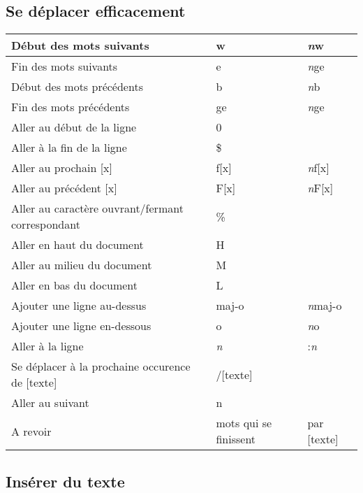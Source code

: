 \documentclass{article}
\begin{document}
\subsection{Se déplacer efficacement}
\begin{center}
\newline\begin{tabular}{|l|l|l|}
    \hline
    Début des mots suivants & w & \textit{n}w \\
    \hline
    Fin des mots suivants & e & \textit{n}ge \\
    \hline
    Début des mots précédents & b & \textit{n}b \\
    \hline
    Fin des mots précédents & ge & \textit{n}ge \\
    \hline
    Aller au début de la ligne & 0 & \\
    \hline
    Aller à la fin de la ligne & \$ & \\
    \hline
    Aller au prochain [x] & f[x] & \textit{n}f[x] \\
    \hline
    Aller au précédent [x] & F[x] & \textit{n}F[x] \\
    \hline
    Aller au caractère ouvrant/fermant correspondant & \% & \\
    \hline
    Aller en haut du document & H & \\
    \hline
    Aller au milieu du document & M & \\
    \hline
    Aller en bas du document & L & \\
    \hline
    Ajouter une ligne au-dessus & maj-o & \textit{n}maj-o \\
    \hline
    Ajouter une ligne en-dessous & o & \textit{n}o\\
    \hline
    Aller à la ligne & \textit{n} & :\textit{n} \\
    \hline
    Se déplacer à la prochaine occurence de [texte] & /[texte] & \\
    Aller au suivant & n & \\
    \hline
    A revoir & mots qui  se finissent & par [texte] \\
    \hline
\end{tabular}
\end{center}




\subsection{Insérer du texte}
\end{document}
